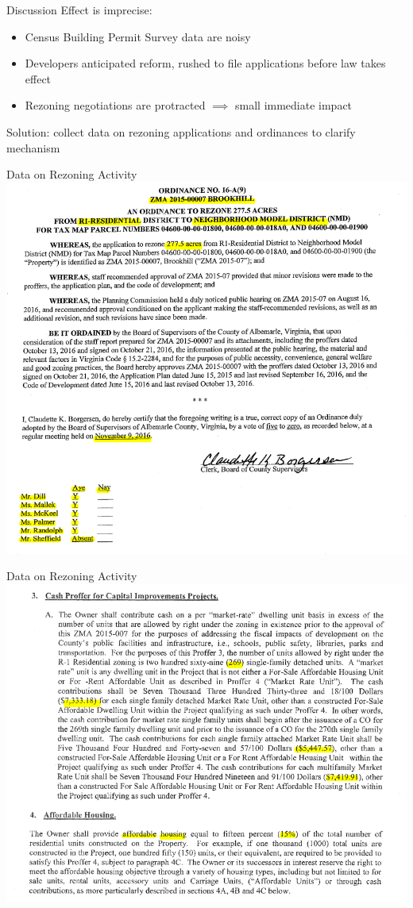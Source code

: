 \documentclass[10pt]{beamer}
\begin{document}
\begin{frame}{Discussion}
Effect is imprecise: 
\begin{itemize}
    \item Census Building Permit Survey data are noisy
    \item Developers anticipated reform, rushed to file applications before law takes effect
    \item Rezoning negotiations are protracted $\implies$ small immediate impact
\end{itemize}
\vspace{2em}
Solution: collect data on rezoning applications and ordinances to clarify mechanism
\end{frame}

\begin{frame}{Data on Rezoning Activity}
    \includegraphics[width=\textwidth]{figures/images/rezoning_example1.png}
\end{frame}

\begin{frame}{Data on Rezoning Activity}
    \includegraphics[width=\textwidth]{figures/images/rezoning_example2.png}
\end{frame}
\end{document}
